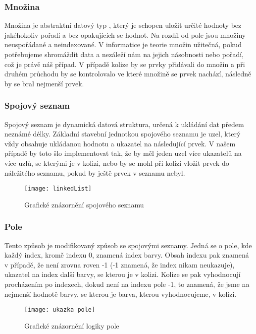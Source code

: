 \documentclass[12pt, a4paper]{article}
\begin{document}
\subsubsection{Množina}
Množina je abstraktní datový typ \cite{Set}, který je schopen uložit určité hodnoty bez jakéhokoliv pořadí a bez opakujících se hodnot. Na rozdíl od pole jsou množiny neuspořádané a neindexované. V informatice je teorie množin užitečná, pokud potřebujeme shromáždit data a nezáleží nám na jejich násobnosti nebo pořadí, což je právě náš případ. V případě kolize by se prvky přidávali do množin a při druhém průchodu by se kontrolovalo ve které množině se prvek nachází, následně by se bral nejmenší prvek.

\subsubsection{Spojový seznam}
Spojový seznam\cite{LinkedList} je dynamická datová struktura, určená k ukládání dat předem neznámé délky. Základní stavební jednotkou spojového seznamu je uzel, který vždy obsahuje ukládanou hodnotu a ukazatel na následující prvek. V našem případě by toto šlo implementovat tak, že by měl jeden uzel více ukazatelů na více uzlů, se kterými je v kolizi, nebo by se mohl při kolizi vložit prvek do náležitého seznamu, pokud by ještě prvek v seznamu nebyl.

\begin{figure}[h!]
\centering 
\texttt{[image: linkedList]} 
\caption{Grafické znázornění spojového seznamu \cite{LinkedList}}
\end{figure}

\subsubsection{Pole}\label{pole}
Tento způsob je modifikovaný způsob se spojovými seznamy. Jedná se o pole, kde každý index, kromě indexu 0, znamená index barvy. Obsah indexu pak znamená v případě, že není zrovna roven -1 (-1 znamená, že index nikam neukazuje), ukazatel na index další barvy, se kterou je v kolizi. Kolize se pak vyhodnocují procházením po indexech, dokud není na indexu pole -1, to znamená, že jsme na nejmenší hodnotě barvy, se kterou je barva, kterou vyhodnocujeme, v kolizi. 

\begin{figure}[h!]
\centering 
\texttt{[image: ukazka pole]} 
\caption{Grafické znázornění logiky pole}
\end{figure}
\end{document}
